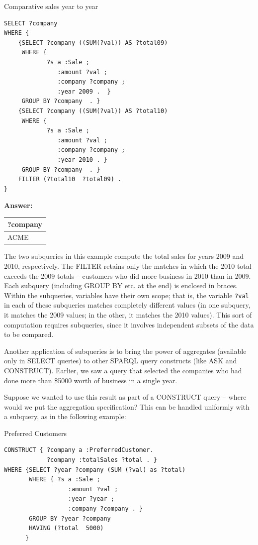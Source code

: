 \begin{query}Comparative sales year to year\end{query}

\begin{lstlisting}
SELECT ?company
WHERE {
    {SELECT ?company ((SUM(?val)) AS ?total09)
     WHERE {
            ?s a :Sale ;
               :amount ?val ;
               :company ?company ;
               :year 2009 .  }
     GROUP BY ?company  . }
    {SELECT ?company ((SUM(?val)) AS ?total10)
     WHERE {
            ?s a :Sale ;
               :amount ?val ;
               :company ?company ;
               :year 2010 . }
     GROUP BY ?company  . }
    FILTER (?total10  ?total09) .
}
\end{lstlisting}
\textbf{\textbf{Answer:}}

\begin{tabular}{|l|}
\hline
?company\\
\hline
ACME\\
\hline
\end{tabular}

The two subqueries in this example compute the total sales for years
2009 and 2010, respectively. The FILTER retains only the matches in
which the 2010 total exceeds the 2009 totals -- customers who did more
business in 2010 than in 2009. Each subquery (including GROUP BY etc. at
the end) is enclosed in braces. Within the subqueries, variables have
their own scope; that is, the variable \texttt{?val} in each of these subqueries
matches completely different values (in one subquery, it matches the
2009 values; in the other, it matches the 2010 values). This sort of
computation requires subqueries, since it involves independent subsets
of the data to be compared.

Another application of subqueries is to bring the power of aggregates
(available only in SELECT queries) to other SPARQL query constructs
(like ASK and CONSTRUCT). Earlier, we saw a query that selected the
companies who had done more than \$5000 worth of business in a single
year.

Suppose we wanted to use this result as part of a CONSTRUCT query --
where would we put the aggregation specification? This can be handled
uniformly with a subquery, as in the following example:

\begin{query}Preferred Customers\end{query}
\begin{lstlisting}
CONSTRUCT { ?company a :PreferredCustomer.
            ?company :totalSales ?total . }
WHERE {SELECT ?year ?company (SUM (?val) as ?total)
       WHERE { ?s a :Sale ;
                  :amount ?val ;
                  :year ?year ;
                  :company ?company . }
       GROUP BY ?year ?company 
       HAVING (?total  5000)
      }
\end{lstlisting}


